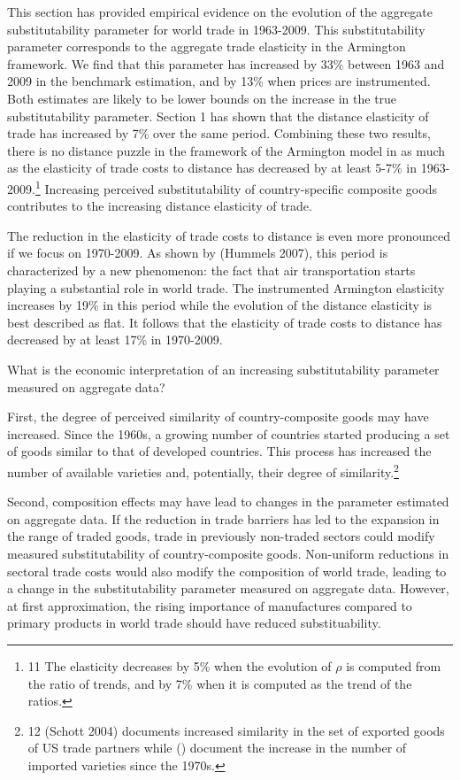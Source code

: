 \documentclass[12pt,twoside,a4paper,notitlepage]{article}
\begin{document}
{This section has provided empirical evidence on the evolution of the aggregate substitutability parameter for world trade in 1963-2009. This substitutability parameter corresponds to the aggregate trade elasticity in the Armington framework. We find that this parameter has increased by 33\% between 1963 and 2009 in the benchmark estimation, and by 13\% when prices are instrumented. Both estimates are likely to be lower bounds on the increase in the true substitutability parameter. Section 1 has shown that the distance elasticity of trade has increased by 7\% over the same period. Combining these two results, there is no distance puzzle in the framework of the Armington model in as much as the elasticity of trade costs to distance has decreased by at least 5-7\% in 1963-2009.\footnote{11 The elasticity decreases by 5\% when the evolution of $\rho$ is computed from the ratio of trends, and by 7\% when it is computed as the trend of the ratios.
} Increasing perceived substitutability of country-specific composite goods contributes to the increasing distance elasticity of trade.

The reduction in the elasticity of trade costs to distance is even more pronounced if we focus on 1970-2009. As shown by (Hummels 2007), this period is characterized by a new phenomenon: the fact that air transportation starts playing a substantial role in world trade. The instrumented Armington elasticity increases by 19\% in this period while the evolution of the distance elasticity is best described as flat. It follows that the elasticity of trade costs to distance has decreased by at least 17\% in 1970-2009. 

What is the economic interpretation of an increasing substitutability parameter measured on aggregate data? 

First, the degree of perceived similarity of country-composite goods may have increased. Since the 1960s, a growing number of countries started producing a set of goods similar to that of developed countries. This process has increased the number of available varieties and, potentially, their degree of similarity.\footnote{12 (Schott 2004) documents increased similarity in the set of exported goods of US trade partners while (\cite{Broda2006}) document the increase in the number of imported varieties since the 1970s.
} 

Second, composition effects may have lead to changes in the parameter estimated on aggregate data. If the reduction in trade barriers has led to the expansion in the range of traded goods, trade in previously non-traded sectors could modify measured substitutability of country-composite goods. Non-uniform reductions in sectoral trade costs would also modify the composition of world trade, leading to a change in the substitutability parameter measured on aggregate data. However, at first approximation, the rising importance of manufactures compared to primary products in world trade should have reduced substituability.

}
\end{document}
